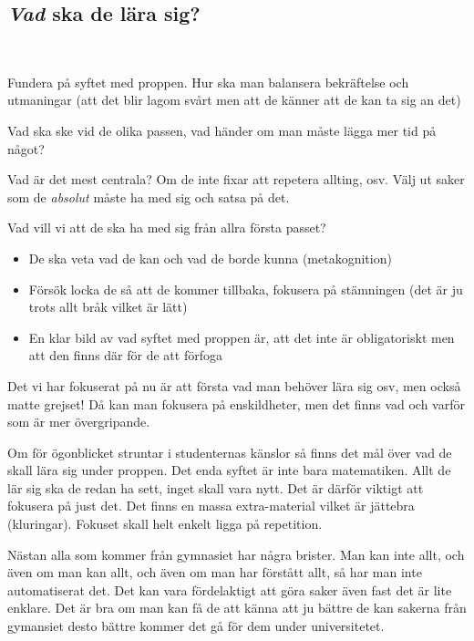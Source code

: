 \subsection{\textit{Vad} ska de lära sig?}\hfill\\
\par\bigskip
\noindent Fundera på syftet med proppen. Hur ska man balansera bekräftelse och utmaningar (att det blir lagom svårt men att de känner att de kan ta sig an det)\par
\noindent Vad ska ske vid de olika passen, vad händer om man måste lägga mer tid på något?\par
\noindent Vad är det mest centrala? Om de inte fixar att repetera allting, osv. Välj ut saker som de \textit{absolut} måste ha med sig och satsa på det.
\par\bigskip
\noindent Vad vill vi att de ska ha med sig från allra första passet?
\par\bigskip
\begin{itemize}
  \item De ska veta vad de kan och vad de borde kunna (metakognition)
  \item Försök locka de så att de kommer tillbaka, fokusera på stämningen (det är ju trots allt bråk vilket är lätt)
  \item En klar bild av vad syftet med proppen är, att det inte är obligatoriskt men att den finns där för de att förfoga
\end{itemize}
\par\bigskip
\noindent Det vi har fokuserat på nu är att första vad man behöver lära sig osv, men också matte grejset! Då kan man fokusera på enskildheter, men det finns vad och varför som är mer övergripande.
\par\bigskip
\noindent Om för ögonblicket struntar i studenternas känslor så finns det mål över vad de skall lära sig under proppen. Det enda syftet är inte bara matematiken. Allt de lär sig ska de redan ha sett, inget skall vara nytt. Det är därför viktigt att fokusera på just det. Det finns en massa extra-material vilket är jättebra (kluringar). Fokuset skall helt enkelt ligga på repetition.
\par\bigskip
\noindent Nästan alla som kommer från gymnasiet har några brister. Man kan inte allt, och även om man kan allt, och även om man har förstått allt, så har man inte automatiserat det. Det kan vara fördelaktigt att göra saker även fast det är lite enklare. Det är bra om man kan få de att känna att ju bättre de kan sakerna från gymansiet desto bättre kommer det gå för dem under universitetet.
